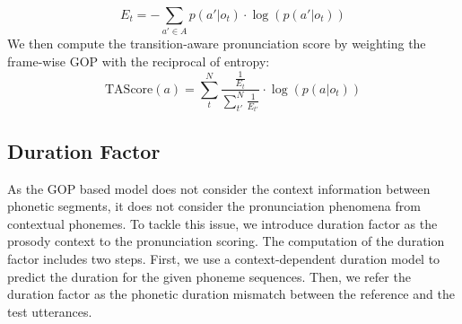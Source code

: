 \documentclass[a4paper]{article}
\begin{document}
\begin{equation}
    \label{eq:entropy}
    E_{t} = -\sum_{a' \in A} p(a'|o_t) \cdot \log(p(a'|o_t))
\end{equation}
We then compute the transition-aware pronunciation score by weighting the frame-wise GOP with the reciprocal of entropy:
\begin{equation}
    \label{eq:transition-aware-gop}
    \text{TAScore}(a) = \sum_t^N \frac{\frac{1}{E_t}}{\sum_{t'}^N \frac{1}{E_{t'}}} \cdot \log(p(a|o_t))
\end{equation}


\subsection{Duration Factor}
As the GOP based model does not consider the context information between phonetic segments, it does not consider the pronunciation phenomena from contextual phonemes. To tackle this issue, we introduce duration factor as the prosody context to the pronunciation scoring. The computation of the duration factor includes two steps. First, we use a context-dependent duration model to predict the duration for the given phoneme sequences. Then, we refer the duration factor as the phonetic duration mismatch between the reference and the test utterances. 
\end{document}
